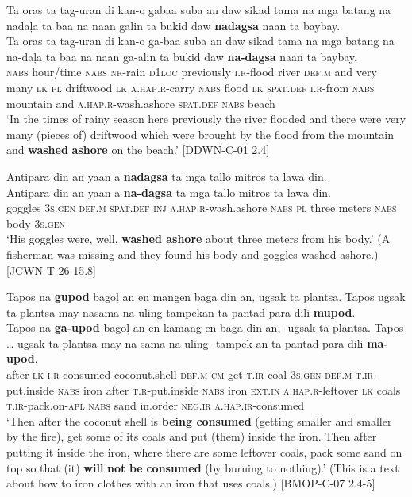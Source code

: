 \ea
Ta  oras  ta  tag-uran  di  kan-o  gabaa  suba  an daw  sikad  tama  na  mga  batang  na  nadaļa  ta  baa  na  naan galin  ta  bukid  daw  \textbf{nadagsa}  naan  ta  baybay.\\\smallskip
\gll Ta  oras  ta  tag-uran  di  kan-o  ga-baa  suba  an daw  sikad  tama  na  mga  batang  na  na-daļa  ta  baa  na  naan ga-alin  ta  bukid  daw  \textbf{na-dagsa}  naan  ta  baybay.\\
\textsc{nabs}  hour/time  \textsc{nabs}  \textsc{nr}-rain  \textsc{d1loc}  previously  \textsc{i.r}-flood  river  \textsc{def.m}
and  very  many  \textsc{lk}  \textsc{pl}  driftwood  \textsc{lk} \textsc{a.}\textsc{hap.r}-carry  \textsc{nabs}  flood  \textsc{lk} \textsc{spat.def} \textsc{i.r}-from  \textsc{nabs}  mountain  and  \textsc{a.hap.r}-wash.ashore  \textsc{spat.def}  \textsc{nabs}  beach \\
\glt ‘In the times of rainy season here previously the river flooded and there were very many (pieces of) driftwood which were brought by the flood from the mountain and \textbf{washed} \textbf{ashore} on the beach.’ [DDWN-C-01 2.4]
\z

\ea
Antipara  din  an  yaan  a  \textbf{nadagsa}  ta  mga  tallo mitros  ta  lawa  din. \\\smallskip
\gll Antipara  din  an  yaan  a  \textbf{na-dagsa}  ta  mga  tallo mitros  ta  lawa  din. \\
goggles  3\textsc{s.gen}  \textsc{def.m}  \textsc{spat.def}  \textsc{inj} \textsc{a.hap.r}-wash.ashore  \textsc{nabs}  \textsc{pl} three
meters  \textsc{nabs}  body  3\textsc{s.gen} \\
\glt ‘His goggles were, well, \textbf{washed ashore} about three meters from his body.’ (A fisherman was missing and they found his body and goggles washed ashore.) [JCWN-T-26 15.8]
\z

\ea
Tapos  na  \textbf{gupod}  bagoļ    an  en  mangen  baga din  an,  ugsak  ta  plantsa.  Tapos  ugsak  ta  plantsa may  nasama  na  uling  tampekan  ta  pantad para  dili  \textbf{mupod}.\\\smallskip
\gll Tapos  na  \textbf{ga-upod}  bagoļ    an  en  kamang-en  baga din  an,  \emptyset{}-ugsak  ta  plantsa.  Tapos  …-ugsak  ta  plantsa may  na-sama  na  uling  \emptyset{}-tampek-an  ta  pantad para  dili  \textbf{ma-upod}.\\
after  \textsc{lk}  \textsc{i.r}-consumed  coconut.shell  \textsc{def.m}  \textsc{cm}  get-\textsc{t.ir}  coal
3\textsc{s.gen}  \textsc{def.m}  \textsc{t.ir}-put.inside \textsc{nabs} iron  after \textsc{t.r}-put.inside  \textsc{nabs} iron
\textsc{ext.in} \textsc{a.}\textsc{hap.r}-leftover  \textsc{lk}  coals  \textsc{t.ir}-pack.on-\textsc{apl}  \textsc{nabs}  sand
in.order  \textsc{neg.ir}  \textsc{a.hap.ir}-consumed \\
\glt ‘Then after the coconut shell is \textbf{being consumed} (getting smaller and smaller by the fire), get some of its coals and put (them) inside the iron. Then after putting it inside the iron, where there are some leftover coals, pack some sand on top so that (it) \textbf{will} \textbf{not} \textbf{be} \textbf{consumed} (by burning to nothing).’ (This is a text about how to iron clothes with an iron that uses coals.) [BMOP-C-07 2.4-5]
\z

